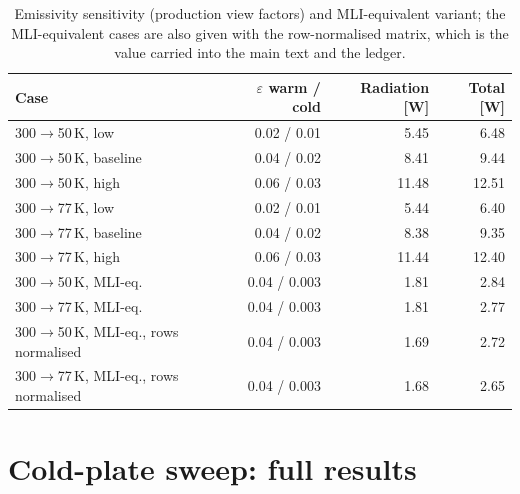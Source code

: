 \documentclass[11pt]{article}
\begin{document}
\begin{table}[H]\centering\small
\caption{Emissivity sensitivity (production view factors) and MLI-equivalent variant; the
MLI-equivalent cases are also given with the row-normalised matrix, which is the value
carried into the main text and the ledger.}
\begin{tabular}{l r r r}
\toprule
Case & $\varepsilon$ warm / cold & Radiation [W] & Total [W] \\
\midrule
300$\to$50\,K, low & 0.02 / 0.01 & 5.45 & 6.48 \\
300$\to$50\,K, baseline & 0.04 / 0.02 & 8.41 & 9.44 \\
300$\to$50\,K, high & 0.06 / 0.03 & 11.48 & 12.51 \\
300$\to$77\,K, low & 0.02 / 0.01 & 5.44 & 6.40 \\
300$\to$77\,K, baseline & 0.04 / 0.02 & 8.38 & 9.35 \\
300$\to$77\,K, high & 0.06 / 0.03 & 11.44 & 12.40 \\
300$\to$50\,K, MLI-eq. & 0.04 / 0.003 & 1.81 & 2.84 \\
300$\to$77\,K, MLI-eq. & 0.04 / 0.003 & 1.81 & 2.77 \\
300$\to$50\,K, MLI-eq., rows normalised & 0.04 / 0.003 & 1.69 & 2.72 \\
300$\to$77\,K, MLI-eq., rows normalised & 0.04 / 0.003 & 1.68 & 2.65 \\
\bottomrule
\end{tabular}\end{table}

\section{Cold-plate sweep: full results}
\begin{landscape}

\end{landscape}
\end{document}
